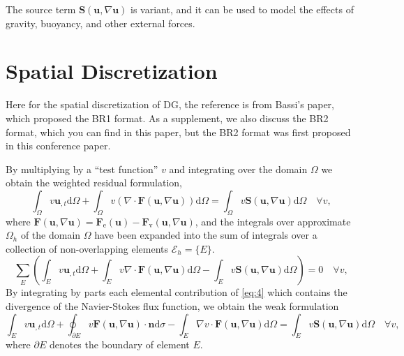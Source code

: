 \documentclass{develop-note}
\begin{document}
The source term $\mathbf{S}(\mathbf{u},\nabla\mathbf{u})$ is variant, and it can be used to model the effects of gravity, buoyancy, and other external forces.

\section{Spatial Discretization}

Here for the spatial discretization of DG, the reference is from Bassi's paper\cite{bassiHighOrderAccurateDiscontinuous1997a}, which proposed the BR1 format. As a supplement, we also discuss the BR2 format, which you can find in this paper\cite{bassiDiscontinuousGalerkinSolution2005}, but the BR2 format was first proposed in this conference paper\cite{bassiHighOrderAccurate1997}.

By multiplying by a ``test function'' $v$ and integrating over the domain $\Omega$ we obtain the weighted residual formulation,
\begin{equation}
  \label{eq:4}
  \int_{\Omega}v\mathbf{u}_{,t}\mathrm{d}\Omega+\int_{\Omega}v(\nabla\cdot\mathbf{F}(\mathbf{u},\nabla\mathbf{u}))\mathrm{d}\Omega=\int_{\Omega}v\mathbf{S}(\mathbf{u},\nabla\mathbf{u})\mathrm{d}\Omega\quad\forall v,
\end{equation}
where $\mathbf{F}(\mathbf{u},\nabla\mathbf{u})=\mathbf{F}_{\mathrm{e}}(\mathbf{u})-\mathbf{F}_{\mathrm{v}}(\mathbf{u},\nabla\mathbf{u})$, and the integrals over approximate $\Omega_{h}$ of the domain $\Omega$ have been expanded into the sum of integrals over a collection of non-overlapping elements $\mathscr{E}_{h}=\{E\}$.
\begin{equation}
  \sum_{E}\left(\int_{E}v\mathbf{u}_{,t}\mathrm{d}\Omega+\int_{E}v\nabla\cdot\mathbf{F}(\mathbf{u},\nabla\mathbf{u})\mathrm{d}\Omega-\int_{E}v\mathbf{S}(\mathbf{u},\nabla\mathbf{u})\mathrm{d}\Omega\right)=0\quad\forall v,
\end{equation}
By integrating by parts each elemental contribution of \autoref{eq:4} which contains the divergence of the Navier-Stokes flux function, we obtain the weak formulation
\begin{equation}
  \label{eq:6}
  \int_{E}v\mathbf{u}_{,t}\mathrm{d}\Omega+\oint_{\partial E}v\mathbf{F}(\mathbf{u},\nabla\mathbf{u})\cdot\mathbf{n}\mathrm{d}\sigma-\int_{E}\nabla v\cdot\mathbf{F}(\mathbf{u},\nabla\mathbf{u})\mathrm{d}\Omega=\int_{E}v\mathbf{S}(\mathbf{u},\nabla\mathbf{u})\mathrm{d}\Omega\quad\forall v,
\end{equation}
where $\partial E$ denotes the boundary of element $E$.
\end{document}
